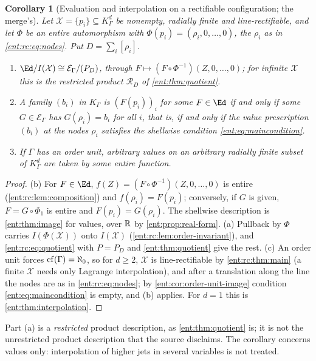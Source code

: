 \documentclass[11pt]{article}
\theoremstyle{plain}
\theoremstyle{plain}
\theoremstyle{plain}
\newtheorem{corollary}[corollary]{Corollary}
\theoremstyle{definition}
\theoremstyle{definition}
\theoremstyle{definition}
\theoremstyle{definition}
\theoremstyle{remark}
\newcommand{\K}{K_\Gamma}\newcommand{\KD}{K_\Delta}
\newcommand{\E}{\mathcal E_\Gamma}
\newcommand{\RD}{\mathcal R_D}\newcommand{\Ucal}{\mathcal U}
\begin{document}
\begin{corollary}[Evaluation and interpolation on a rectifiable
configuration; the merge's]\label{ent:rc:cor:evaluation}
Let $\mathcal X=\{p_i\}\subseteq\K^d$ be nonempty, radially finite and
line-rectifiable, and let $\Phi$ be an entire automorphism with
$\Phi(p_i)=(\rho_i,0,\ldots,0)$, the $\rho_i$ as in \eqref{ent:rc:eq:nodes}.
Put $D=\sum_i[\rho_i]$.
\begin{enumerate}[label=\textnormal{(\alph*)},leftmargin=2em]
\item $\Ed/I(\mathcal X)\cong\E/(P_D)$, through
$F\mapsto(F\circ\Phi^{-1})(Z,0,\ldots,0)$; for infinite $\mathcal X$ this is
the restricted product $\RD$ of \cref{ent:thm:quotient}.
\item A family $(b_i)$ in $\K$ is $(F(p_i))_i$ for some $F\in\Ed$ if and only
if some $G\in\E$ has $G(\rho_i)=b_i$ for all $i$, that is, if and only if the
value prescription $(b_i)$ at the nodes $\rho_i$ satisfies the shellwise
condition \eqref{ent:eq:maincondition}.
\item If $\Gamma$ has an order unit, arbitrary values on an arbitrary radially
finite subset of $\K^d$ are taken by some entire function.
\end{enumerate}
\end{corollary}
\begin{proof}
(b) For $F\in\Ed$, $f(Z)=(F\circ\Phi^{-1})(Z,0,\ldots,0)$ is entire
(\cref{ent:rc:lem:composition}) and $f(\rho_i)=F(p_i)$; conversely, if $G$ is
given, $F=G\circ\Phi_1$ is entire and $F(p_i)=G(\rho_i)$. The shellwise
description is \cref{ent:thm:image} for values, over $\mathbb R$ by
\cref{ent:prop:real-form}. (a) Pullback by $\Phi$ carries
$I(\Phi(\mathcal X))$ onto $I(\mathcal X)$ (\cref{ent:rc:lem:order-invariant}),
and \eqref{ent:rc:eq:quotient} with $P=P_D$ and \cref{ent:thm:quotient} give
the rest. (c) An order unit forces $\operatorname{cf}(\Gamma)=\aleph_0$, so for $d\ge2$,
$\mathcal X$ is line-rectifiable by \cref{ent:rc:thm:main} (a finite
$\mathcal X$ needs only Lagrange interpolation), and after a translation along the line the nodes are
as in \eqref{ent:rc:eq:nodes}; by \cref{ent:cor:order-unit-image}
condition \eqref{ent:eq:maincondition} is empty, and (b) applies. For $d=1$
this is \cref{ent:thm:interpolation}.
\end{proof}

Part (a) is a \emph{restricted} product description, as \cref{ent:thm:quotient}
is; it is not the unrestricted product description that the source disclaims.
The corollary concerns values only: interpolation of higher jets in several
variables is not treated.
\end{document}
